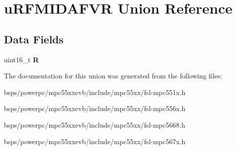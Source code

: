 \hypertarget{unionuRFMIDAFVR}{}\section{u\+R\+F\+M\+I\+D\+A\+F\+VR Union Reference}
\label{unionuRFMIDAFVR}
\subsection*{Data Fields}
\begin{DoxyCompactItemize}
\item 
\mbox{\label{unionuRFMIDAFVR_ab623663aedfe4c862e86da4ecd372629}} 
uint16\+\_\+t {\bfseries R}
\end{DoxyCompactItemize}


The documentation for this union was generated from the following files\+:\begin{DoxyCompactItemize}
\item 
bsps/powerpc/mpc55xxevb/include/mpc55xx/fsl-\/mpc551x.\+h\item 
bsps/powerpc/mpc55xxevb/include/mpc55xx/fsl-\/mpc556x.\+h\item 
bsps/powerpc/mpc55xxevb/include/mpc55xx/fsl-\/mpc5668.\+h\item 
bsps/powerpc/mpc55xxevb/include/mpc55xx/fsl-\/mpc567x.\+h\end{DoxyCompactItemize}
